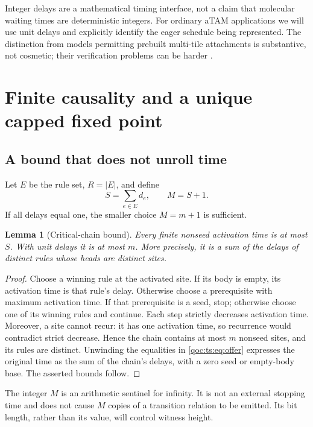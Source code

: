 \documentclass[11pt,letterpaper]{article}
\newtheorem{lemma}[theorem]{Lemma}
\theoremstyle{definition}
\theoremstyle{remark}
\begin{document}
Integer delays are a mathematical timing interface, not a claim that
molecular waiting times are deterministic integers. For ordinary aTAM
applications we will use unit delays and explicitly identify the eager
schedule being represented. The distinction from models permitting
prebuilt multi-tile attachments is substantive, not cosmetic; their
verification problems can be harder \cite{ts:caballero}.

\section{Finite causality and a unique capped fixed point}
\subsection{A bound that does not unroll time}
Let $E$ be the rule set, $R=|E|$, and define
\begin{equation}\label{qoc:ts:eq:cap}
 S=\sum_{e\in E}d_e,\qquad M=S+1.
\end{equation}
If all delays equal one, the smaller choice $M=m+1$ is sufficient.

\begin{lemma}[Critical-chain bound]\label{qoc:ts:lem:bound}
Every finite nonseed activation time is at most $S$. With unit delays it
is at most $m$. More precisely, it is a sum of the delays of distinct
rules whose heads are distinct sites.
\end{lemma}
\begin{proof}
Choose a winning rule at the activated site. If its body is empty, its
activation time is that rule's delay. Otherwise choose a prerequisite
with maximum activation time. If that prerequisite is a seed, stop;
otherwise choose one of its winning rules and continue. Each step strictly
decreases activation time. Moreover, a site cannot recur: it has one
activation time, so recurrence would contradict strict decrease. Hence
the chain contains at most $m$ nonseed sites, and its rules are distinct.
Unwinding the equalities in \eqref{qoc:ts:eq:offer} expresses the original time
as the sum of the chain's delays, with a zero seed or empty-body base.
The asserted bounds follow.
\end{proof}

The integer $M$ is an arithmetic sentinel for infinity. It is not an
external stopping time and does not cause $M$ copies of a transition
relation to be emitted. Its bit length, rather than its value, will control
witness height.
\end{document}

